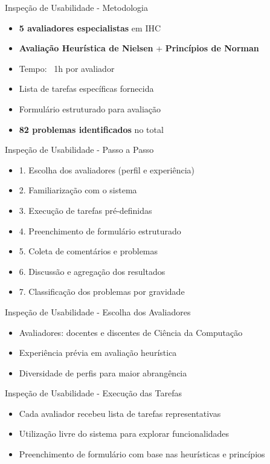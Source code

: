 \documentclass[landscape, 12pt]{beamer}
\begin{document}
\begin{frame}{Inspeção de Usabilidade - Metodologia}
    \begin{itemize}
        \item \textbf{5 avaliadores especialistas} em IHC
        \item \textbf{Avaliação Heurística de Nielsen} + \textbf{Princípios de Norman}
        \item Tempo: ~1h por avaliador
        \item Lista de tarefas específicas fornecida
        \item Formulário estruturado para avaliação
        \item \textbf{82 problemas identificados} no total
    \end{itemize}
\end{frame}

\begin{frame}{Inspeção de Usabilidade - Passo a Passo}
    \begin{itemize}
        \item 1. Escolha dos avaliadores (perfil e experiência)
        \item 2. Familiarização com o sistema
        \item 3. Execução de tarefas pré-definidas
        \item 4. Preenchimento de formulário estruturado
        \item 5. Coleta de comentários e problemas
        \item 6. Discussão e agregação dos resultados
        \item 7. Classificação dos problemas por gravidade
    \end{itemize}
\end{frame}

\begin{frame}{Inspeção de Usabilidade - Escolha dos Avaliadores}
    \begin{itemize}
        \item Avaliadores: docentes e discentes de Ciência da Computação
        \item Experiência prévia em avaliação heurística
        \item Diversidade de perfis para maior abrangência
    \end{itemize}
\end{frame}

\begin{frame}{Inspeção de Usabilidade - Execução das Tarefas}
    \begin{itemize}
        \item Cada avaliador recebeu lista de tarefas representativas
        \item Utilização livre do sistema para explorar funcionalidades
        \item Preenchimento de formulário com base nas heurísticas e princípios
    \end{itemize}
\end{frame}
\end{document}
